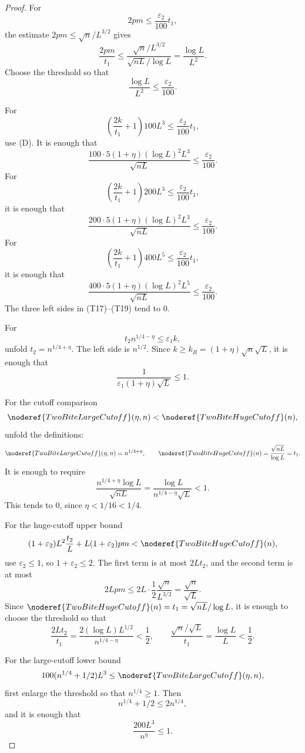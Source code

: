 \begin{proof}
For
\[
2pm\le\frac{\varepsilon_2}{100}t_1,
\]
the estimate \(2pm\le\sqrt n/L^{3/2}\) gives
\[
\frac{2pm}{t_1}\le
\frac{\sqrt n/L^{3/2}}{\sqrt{nL}/\log L}
=\frac{\log L}{L^2}.
\]
Choose the threshold so that
\[
\frac{\log L}{L^2}\le\frac{\varepsilon_2}{100}. \tag{T16}
\]

For
\[
\left(\frac{2k}{t_1}+1\right)100L^3
\le\frac{\varepsilon_2}{100}t_1,
\]
use (D).  It is enough that
\[
\frac{100\cdot5(1+\eta)(\log L)^2L^3}{\sqrt{nL}}
\le\frac{\varepsilon_2}{100}. \tag{T17}
\]
For
\[
\left(\frac{2k}{t_1}+1\right)200L^3
\le\frac{\varepsilon_2}{100}t_1,
\]
it is enough that
\[
\frac{200\cdot5(1+\eta)(\log L)^2L^3}{\sqrt{nL}}
\le\frac{\varepsilon_2}{100}. \tag{T18}
\]
For
\[
\left(\frac{2k}{t_1}+1\right)400L^5
\le\frac{\varepsilon_2}{100}t_1,
\]
it is enough that
\[
\frac{400\cdot5(1+\eta)(\log L)^2L^5}{\sqrt{nL}}
\le\frac{\varepsilon_2}{100}. \tag{T19}
\]
The three left sides in (T17)--(T19) tend to \(0\).

For
\[
t_2 n^{1/4-\eta}\le\varepsilon_1 k,
\]
unfold \(t_2=n^{1/4+\eta}\).  The left side is \(n^{1/2}\).  Since
\(k\ge k_R=(1+\eta)\sqrt n\sqrt L\), it is enough that
\[
\frac{1}{\varepsilon_1(1+\eta)\sqrt L}\le1. \tag{T20}
\]

For the cutoff comparison
\[
\noderef{TwoBiteLargeCutoff}(\eta,n)<\noderef{TwoBiteHugeCutoff}(n),
\]
unfold the definitions:
\[
\noderef{TwoBiteLargeCutoff}(\eta,n)=n^{1/4+\eta},
\qquad
\noderef{TwoBiteHugeCutoff}(n)=\frac{\sqrt{nL}}{\log L}=t_1.
\]
It is enough to require
\[
\frac{n^{1/4+\eta}\log L}{\sqrt{nL}}
=\frac{\log L}{n^{1/4-\eta}\sqrt L}<1. \tag{T21}
\]
This tends to \(0\), since \(\eta<1/16<1/4\).

For the huge-cutoff upper bound
\[
(1+\varepsilon_2)L^2\frac{t_2}{L}
  +L(1+\varepsilon_2)pm
<\noderef{TwoBiteHugeCutoff}(n),
\]
use \(\varepsilon_2\le1\), so \(1+\varepsilon_2\le2\).  The first term is at
most \(2Lt_2\), and the second term is at most
\[
2Lpm\le 2L\cdot\frac12\frac{\sqrt n}{L^{3/2}}
=\frac{\sqrt n}{\sqrt L}.
\]
Since \(\noderef{TwoBiteHugeCutoff}(n)=t_1=\sqrt{nL}/\log L\), it is enough to
choose the threshold so that
\[
\frac{2Lt_2}{t_1}
=\frac{2(\log L)L^{1/2}}{n^{1/4-\eta}}<\frac12,
\qquad
\frac{\sqrt n/\sqrt L}{t_1}
=\frac{\log L}{L}<\frac12. \tag{T22}
\]

For the large-cutoff lower bound
\[
100(n^{1/4}+1/2)L^3\le\noderef{TwoBiteLargeCutoff}(\eta,n),
\]
first enlarge the threshold so that \(n^{1/4}\ge1\).  Then
\[
n^{1/4}+1/2\le2n^{1/4},
\]
and it is enough that
\[
\frac{200L^3}{n^\eta}\le1. \tag{T23}
\]


\end{proof}
